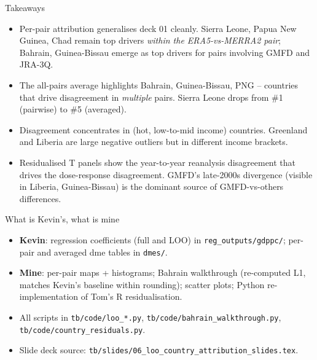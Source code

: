 \documentclass[10pt,aspectratio=169]{beamer}
\begin{document}
\begin{frame}{Takeaways}
  \begin{itemize}\setlength{\itemsep}{4pt}
    \item Per-pair attribution generalises deck 01 cleanly. Sierra Leone,
          Papua New Guinea, Chad remain top drivers \emph{within the
          ERA5-vs-MERRA2 pair}; Bahrain, Guinea-Bissau emerge as top drivers
          for pairs involving GMFD and JRA-3Q.
    \item The all-pairs average highlights Bahrain, Guinea-Bissau, PNG --
          countries that drive disagreement in \emph{multiple} pairs.
          Sierra Leone drops from \#1 (pairwise) to \#5 (averaged).
    \item Disagreement concentrates in (hot, low-to-mid income) countries.
          Greenland and Liberia are large negative outliers but in different
          income brackets.
    \item Residualised T panels show the year-to-year reanalysis disagreement
          that drives the dose-response disagreement. GMFD's late-2000s
          divergence (visible in Liberia, Guinea-Bissau) is the dominant
          source of GMFD-vs-others differences.
  \end{itemize}
\end{frame}

\begin{frame}{What is Kevin's, what is mine}
  \begin{itemize}\setlength{\itemsep}{3pt}
    \item \textbf{Kevin}: regression coefficients (full and LOO) in
          \texttt{reg\_outputs/gdppc/}; per-pair and averaged dme tables in
          \texttt{dmes/}.
    \item \textbf{Mine}: per-pair maps + histograms; Bahrain walkthrough
          (re-computed L1, matches Kevin's baseline within rounding);
          scatter plots; Python re-implementation of Tom's R residualisation.
    \item All scripts in \texttt{tb/code/loo\_*.py},
          \texttt{tb/code/bahrain\_walkthrough.py},
          \texttt{tb/code/country\_residuals.py}.
    \item Slide deck source: \texttt{tb/slides/06\_loo\_country\_attribution\_slides.tex}.
  \end{itemize}
\end{frame}
\end{document}
